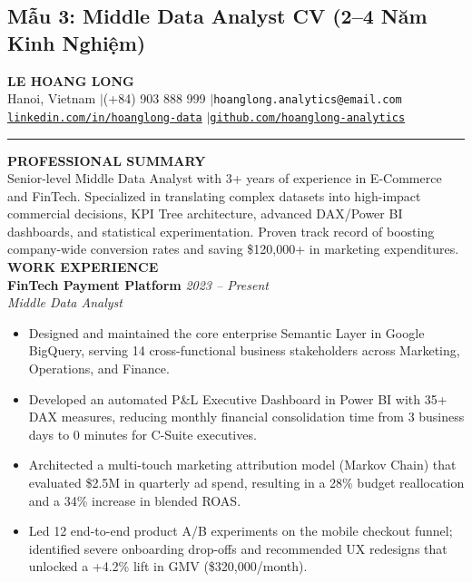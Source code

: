 \subsection{Mẫu 3: Middle Data Analyst CV (2--4 Năm Kinh Nghiệm)}
\begin{samplecvbox}
{\centering
    {\LARGE \textbf{LE HOANG LONG}}\\[2pt]
    \small Hanoi, Vietnam \enspace$|$\enspace (+84) 903 888 999 \enspace$|$\enspace \texttt{hoanglong.analytics@email.com}\\
    \href{https://linkedin.com/in/hoanglong-data}{\texttt{linkedin.com/in/hoanglong-data}} \enspace$|$\enspace \href{https://github.com/hoanglong-analytics}{\texttt{github.com/hoanglong-analytics}}\\[6pt]
}
\hrule\vspace{6pt}

\textbf{\large PROFESSIONAL SUMMARY}\\
Senior-level Middle Data Analyst with 3+ years of experience in E-Commerce and FinTech. Specialized in translating complex datasets into high-impact commercial decisions, KPI Tree architecture, advanced DAX/Power BI dashboards, and statistical experimentation. Proven track record of boosting company-wide conversion rates and saving \$120,000+ in marketing expenditures.\\[6pt]

\textbf{\large WORK EXPERIENCE}\\
\textbf{FinTech Payment Platform} \hfill \textit{2023 -- Present}\\
\textit{Middle Data Analyst}
\begin{itemize}[leftmargin=12pt, nosep]
    \item Designed and maintained the core enterprise Semantic Layer in Google BigQuery, serving 14 cross-functional business stakeholders across Marketing, Operations, and Finance.
    \item Developed an automated P\&L Executive Dashboard in Power BI with 35+ DAX measures, reducing monthly financial consolidation time from 3 business days to 0 minutes for C-Suite executives.
    \item Architected a multi-touch marketing attribution model (Markov Chain) that evaluated \$2.5M in quarterly ad spend, resulting in a 28\% budget reallocation and a 34\% increase in blended ROAS.
    \item Led 12 end-to-end product A/B experiments on the mobile checkout funnel; identified severe onboarding drop-offs and recommended UX redesigns that unlocked a +4.2\% lift in GMV (\$320,000/month).
\end{itemize}\vspace{4pt}


\end{samplecvbox}
